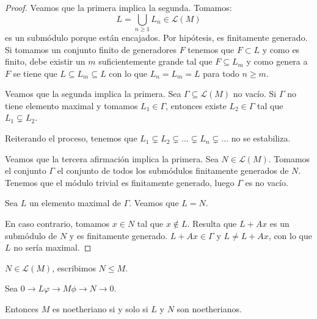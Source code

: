 \begin{proof}
  Veamos que la primera implica la segunda.
  Tomamos:
  \[
    L=\bigcup_{n\ge 1} L_n\in\mathcal{L}(M)
  \]
  es un submódulo porque están encajados. Por hipótesis, es finitamente
  generado. Si tomamos un conjunto finito de generadores \(F\)
  tenemos que \(F\subset L\) y como es finito, debe existir un \(m\)
  suficientemente grande tal que \(F\subseteq L_m\) y como
  genera a \(F\) se tiene que \(L\subseteq L_m\subseteq L\)
  con lo que \(L_n=L_m=L\) para todo \(n\ge m\).

  Veamos que la segunda implica la primera. Sea \(\Gamma\subseteq
  \mathcal{L}(M)\) no vacío. Si \(\Gamma\) no tiene elemento maximal
  y tomamos \(L_1\in\Gamma\), entonces existe \(L_2\in\Gamma\)
  tal que \(L_1\subsetneq L_2\).

  Reiterando el proceso, tenemos que \(L_1\subsetneq L_2\subsetneq
  \ldots\subsetneq L_n\subsetneq\ldots\) no se estabiliza.

  Veamos que la tercera afirmación implica la primera.
  Sea \(N\in\mathcal{L}(M)\).
  Tomamos el conjunto \(\Gamma\) el conjunto de todos los submódulos
  finitamente generados de \(N\). Tenemos que el módulo trivial
  es finitamente generado, luego \(\Gamma\) es no vacío.

  Sea \(L\) un elemento maximal de \(\Gamma\). Veamos que \(L=N\).

  En caso contrario, tomamos \(x\in N\) tal que \(x\notin L\). Resulta que
  \(L+Ax\) es un submódulo de \(N\) y es finitamente generado.
  \(L+Ax\in\Gamma\) y \(L\neq L+Ax\), con lo que \(L\) no sería maximal.
\end{proof}

\begin{nt}
  \(N\in\mathcal{L}(M)\), escribimos \(N\le M\).
\end{nt}

\begin{prop}
  Sea \(0\longrightarrow L\varphi\longrightarrow M\phi\longrightarrow N
  \longrightarrow 0\).

  Entonces \(M\) es noetheriano si y solo si \(L\) y \(N\) son
  noetherianos.
\end{prop}

